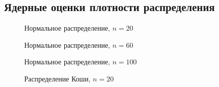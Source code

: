 \subsection{Ядерные оценки плотности распределения}
\label{subsec:result_kde}
\begin{figure}[H]
		\caption{Нормальное распределение, $n=20$}
		\label{fig:kde_normal20}
	\end{figure}

\begin{figure}[H]
		\caption{Нормальное распределение, $n=60$}
		\label{fig:kde_normal60}
	\end{figure}

\begin{figure}[H]
		\caption{Нормальное распределение, $n=100$}
		\label{fig:kde_normal100}
	\end{figure}

\begin{figure}[H]
		\caption{Распределение Коши, $n=20$}
		\label{fig:kde_cauchy20}
	\end{figure}

